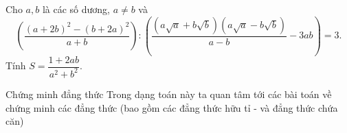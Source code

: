 \begin{bt}%
	Cho $a,b$ là các số dương, $a\neq b$ và
	$$\left(\dfrac{(a+2b)^2-(b+2a)^2}{a+b}\right):\left(\dfrac{(a\sqrt{a}+b\sqrt{b})(a\sqrt{a}-b\sqrt{b})}{a-b}-3ab\right)=3.$$
	Tính $S=\dfrac{1+2ab}{a^2+b^2}.$
	
\end{bt}






\begin{dang}{Chứng minh đẳng thức}
	Trong dạng toán này ta quan tâm tới các bài toán về chứng minh các đẳng thức (bao gồm các đẳng thức hữu tỉ - và đẳng thức chứa căn)
\end{dang}

